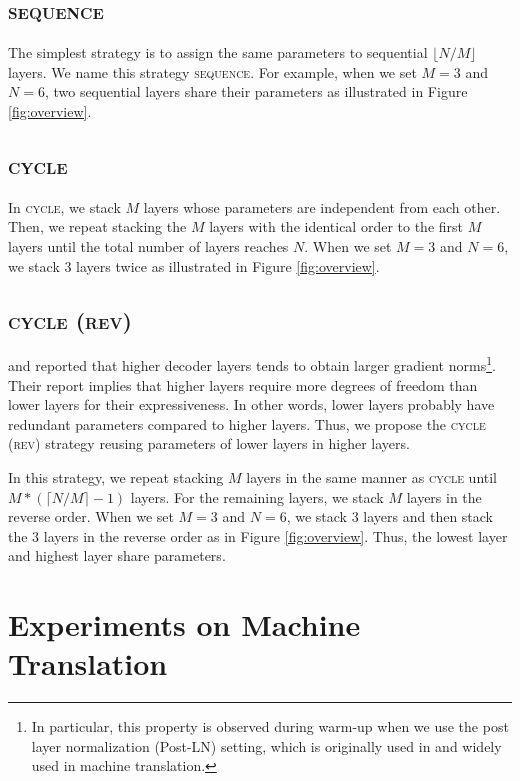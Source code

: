 \documentclass[11pt]{article}
\begin{document}
\subsection{\textsc{sequence}}
The simplest strategy is to assign the same parameters to sequential $\lfloor N / M \rfloor$ layers.
We name this strategy \textsc{sequence}.
For example, when we set $M=3$ and $N=6$, two sequential layers share their parameters as illustrated in Figure \ref{fig:overview}.


\subsection{\textsc{cycle}}
In \textsc{cycle}, we stack $M$ layers whose parameters are independent from each other.
Then, we repeat stacking the $M$ layers with the identical order to the first $M$ layers until the total number of layers reaches $N$.
When we set $M=3$ and $N=6$, we stack $3$ layers twice as illustrated in Figure \ref{fig:overview}.


\subsection{\textsc{cycle (rev)}}
\citet{liu-etal-2020-understanding} and \citet{takase:2022:b2t} reported that higher decoder layers tends to obtain larger gradient norms\footnote{In particular, this property is observed during warm-up when we use the post layer normalization (Post-LN) setting, which is originally used in  and widely used in machine translation.}.
Their report implies that higher layers require more degrees of freedom than lower layers for their expressiveness.
In other words, lower layers probably have redundant parameters compared to higher layers.
Thus, we propose the \textsc{cycle (rev)} strategy reusing parameters of lower layers in higher layers.


In this strategy, we repeat stacking $M$ layers in the same manner as \textsc{cycle} until $M * (\lceil N / M \rceil - 1)$ layers.
For the remaining layers, we stack $M$ layers in the reverse order.
When we set $M=3$ and $N=6$, we stack $3$ layers and then stack the $3$ layers in the reverse order as in Figure \ref{fig:overview}.
Thus, the lowest layer and highest layer share parameters.



\section{Experiments on Machine Translation}
\label{sec:exp_mt}
\end{document}
